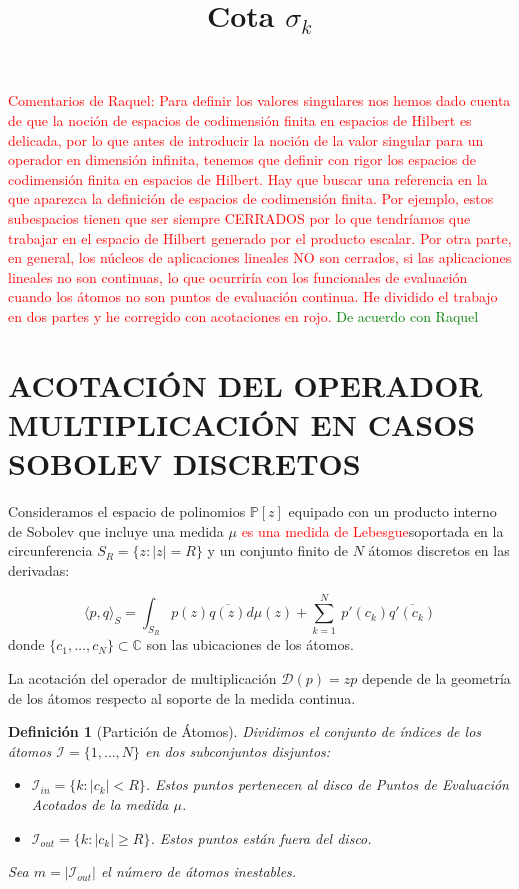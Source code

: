 \documentclass[12pt,a4paper]{article}
\title{Cota $\sigma_k$}
\author{}
\date{}
\newtheorem{definicion}{Definición}
\newcommand{\C}{\mathbb{C}}
\newcommand{\Poly}{\mathbb{P}[z]}
\newcommand{\ip}[2]{\langle #1, #2 \rangle_S}
\newcommand{\D}{\mathcal{D}}
\begin{document}
\maketitle

\textcolor{red}{Comentarios de Raquel:  Para definir los valores singulares nos hemos dado cuenta de que la noción de espacios de codimensión finita en espacios de Hilbert es delicada, por lo que   antes de introducir la noción de la valor singular para un operador en dimensión infinita, tenemos que   definir con rigor los espacios de codimensión finita en espacios de Hilbert. Hay que buscar una referencia en la que aparezca la definición de espacios de codimensión finita. Por ejemplo, estos subespacios tienen que ser siempre CERRADOS por lo que tendríamos que trabajar en el espacio de Hilbert generado por el producto escalar. Por otra parte,  en general, los núcleos de aplicaciones lineales NO son cerrados, si las aplicaciones lineales no son continuas, lo que ocurriría con los funcionales de evaluación cuando los átomos no son puntos de evaluación continua. He dividido el trabajo en dos partes y he corregido con acotaciones en rojo. 
}
\textcolor{green}{De acuerdo con Raquel}
\section{ACOTACIÓN DEL OPERADOR MULTIPLICACIÓN EN CASOS SOBOLEV DISCRETOS}
 Consideramos el espacio de polinomios $\Poly$ equipado con un producto interno de Sobolev que incluye una medida $\mu$ \textcolor{red}{es una medida de Lebesgue}soportada en la circunferencia $S_R = \{z : |z|=R\}$ y un conjunto finito de $N$ átomos discretos en las derivadas:

\begin{equation}
    \ip{p}{q} = \int_{S_R} p(z)\overline{q(z)} d\mu(z) + \sum_{k=1}^{N} \ p'(c_k)\overline{q'(c_k)}
\end{equation}
donde $\{c_1, \dots, c_N\} \subset \C$ son las ubicaciones de los átomos.

La acotación del operador de multiplicación $\D(p) = zp$ depende de la geometría de los átomos respecto al soporte de la medida continua.

\begin{definicion}[Partición de Átomos]
Dividimos el conjunto de índices de los átomos $\mathcal{I} = \{1, \dots, N\}$ en dos subconjuntos disjuntos:
\begin{itemize}
    \item $\mathcal{I}_{in} = \{ k : |c_k| < R \}$. Estos puntos pertenecen al disco de Puntos de Evaluación Acotados de la medida $\mu$.
    \item $\mathcal{I}_{out} = \{ k : |c_k| \ge  R \}$. Estos puntos están fuera del disco.
\end{itemize}
Sea $m = |\mathcal{I}_{out}|$ el número de átomos inestables.
\end{definicion}
\end{document}
